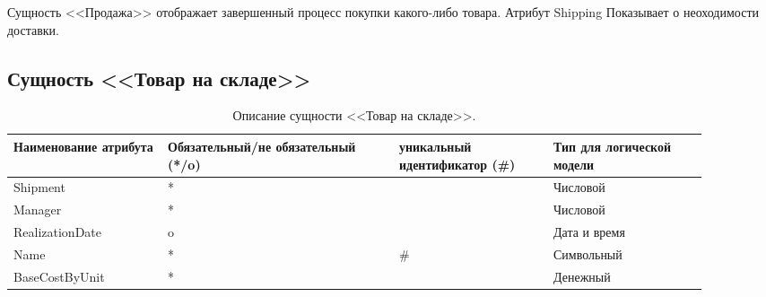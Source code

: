 \documentclass[14pt]{extreport}
\begin{document}
        Сущность <<Продажа>> отображает завершенный процесс покупки какого-либо товара. Атрибут Shipping Показывает о неоходимости доставки.
    
    \subsection*{Сущность <<Товар на складе>>}

        \begin{table}[H]
            \begin{tabular}{|p{0.2\linewidth}|p{0.3\linewidth}|p{0.2\linewidth}|p{0.2\linewidth}|}
                \hline
                Наименование атрибута & Обязательный/не обязательный (*/o) & уникальный идентификатор (\#) & Тип для логической модели
                \\ \hline
                Shipment & * & & Числовой\\ \hline
                Manager & * & & Числовой\\ \hline
                RealizationDate & o & & Дата и время \\ \hline
                Name & * & \# & Символьный  \\ \hline
                BaseCostByUnit & * & & Денежный \\ \hline  
            \end{tabular}
            \caption{Описание сущности <<Товар на складе>>.}
        \end{table}

        
\end{document}
